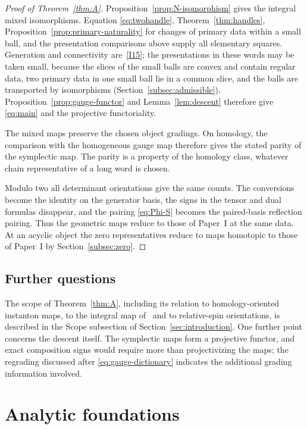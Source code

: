 \documentclass[11pt]{amsart}
\theoremstyle{definition}
\theoremstyle{remark}
\theoremstyle{plain}
\numberwithin{equation}{section}
\begin{document}
\begin{proof}[Proof of Theorem~\ref{thm:A}]
Proposition~\ref{prop:N-isomorphism}
gives the integral mixed
isomorphisms. Equation
\eqref{eq:twohandle},
Theorem~\ref{thm:handles},
Proposition~\ref{prop:primary-naturality}
for changes of primary data within a
small ball, and the presentation
comparisons above supply all elementary
squares. Generation and
connectivity are~\ref{I15}; the presentations in these words
may be taken small, because the slices of the
small balls are convex and contain
regular data, two primary data in one
small ball lie in a common slice,
and the balls are transported by
isomorphisms (Section~\ref{subsec:admissible}).
Proposition~\ref{prop:gauge-functor}
and Lemma~\ref{lem:descent}
therefore give
\eqref{eq:main} and the
projective functoriality.

The mixed maps preserve the
chosen object gradings. On
homology, the comparison with
the homogeneous gauge map
therefore gives the stated
parity of the symplectic map.
The parity is a property of the
homology class, whatever chain
representative of a long word is
chosen.

Modulo two all determinant
orientations give the same
counts. The conversions become
the identity on the generator
basis, the signs in the tensor
and dual formulas disappear,
and the pairing
\eqref{eq:Phi-S} becomes the
paired-basis reflection
pairing. Thus the geometric
maps reduce to those of
Paper~I at the same data. At
an acyclic object the zero
representatives reduce to
maps homotopic to those of
Paper~I by
Section~\ref{subsec:zero}.
\end{proof}

\subsection{Further questions}
The scope of Theorem~\ref{thm:A}, including its relation to
homology-oriented instanton maps, to the integral map of~\cite{DFL}
and to relative-spin orientations, is described in the Scope
subsection of Section~\ref{sec:introduction}. One further point
concerns the descent itself. The symplectic maps form a projective
functor, and exact composition signs would require more than
projectivizing the maps; the regrading discussed after
\eqref{eq:gauge-dictionary} indicates the additional grading
information involved.

\appendix
\section{Analytic foundations}\label{app:inputs}
\end{document}

